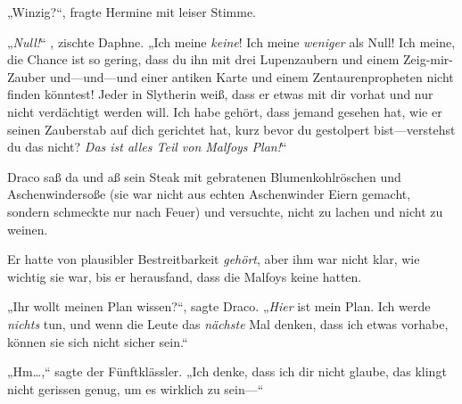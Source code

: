 „Winzig?“, fragte Hermine mit leiser Stimme.

„\emph{Null!}“ , zischte Daphne. „Ich meine \emph{keine}! Ich meine \emph{weniger} als Null! Ich meine, die Chance ist so gering, dass du ihn mit drei Lupenzaubern und einem Zeig-mir-Zauber und—und—und einer antiken Karte und einem Zentaurenpropheten nicht finden könntest! Jeder in Slytherin weiß, dass er etwas mit dir vorhat und nur nicht verdächtigt werden will. Ich habe gehört, dass jemand gesehen hat, wie er seinen Zauberstab auf dich gerichtet hat, kurz bevor du gestolpert bist—verstehst du das nicht? \emph{Das ist alles Teil von Malfoys Plan!}“

\later

Draco saß da und aß sein Steak mit gebratenen Blumenkohlröschen und Aschenwindersoße (sie war nicht aus echten Aschenwinder Eiern gemacht, sondern schmeckte nur nach Feuer) und versuchte, nicht zu lachen und nicht zu weinen.

Er hatte von plausibler Bestreitbarkeit \emph{gehört}, aber ihm war nicht klar, wie wichtig sie war, bis er herausfand, dass die Malfoys keine hatten.

„Ihr wollt meinen Plan wissen?“, sagte Draco. „\emph{Hier} ist mein Plan. Ich werde \emph{nichts} tun, und wenn die Leute das \emph{nächste} Mal denken, dass ich etwas vorhabe, können sie sich nicht sicher sein.“

„Hm…,“ sagte der Fünftklässler. „Ich denke, dass ich dir nicht glaube, das klingt nicht gerissen genug, um es wirklich zu sein—“

